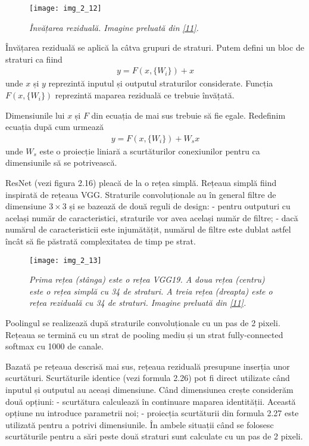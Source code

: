 \begin{figure}[!h]
	\centering
	\texttt{[image: img\_2\_12]}
	\caption[Învățarea reziduală]{\textit{Învățarea reziduală. Imagine preluată din \hyperlink{KaimingHeXiangyuZhangShaoqingRenJianSun}{[11]}.}}
\end{figure}  

Învățarea reziduală se aplică la câtva grupuri de straturi. Putem defini un bloc de straturi ca fiind 
\begin{align}
	y = F(x,\{W_i\}) + x
\end{align}
unde $x$ și $y$ reprezintă inputul și outputul straturilor considerate. Funcția $F(x, \{W_i\})$ reprezintă maparea reziduală ce trebuie învățată.

Dimensiunile lui $x$ și $F$ din ecuația de mai sus trebuie să fie egale. Redefinim ecuația după cum urmează
\begin{align}
	y = F(x,\{W_i\}) + W_sx
\end{align}
unde $W_s$ este o proiecție liniară a scurtăturilor conexiunilor pentru ca dimensiunile să se potrivească.

ResNet (vezi figura 2.16) pleacă de la o rețea simplă. Rețeaua simplă fiind inspirată de rețeaua VGG. Straturile convoluționale au în general filtre de dimensiune $3 \times 3$ și se bazează de două reguli de design: - pentru outputuri cu același număr de caracteristici, straturile vor avea același număr de filtre; - dacă numărul de caracteristicii este injumătățit, numărul de filtre este dublat astfel încât să fie păstrată complexitatea de timp pe strat.

\begin{figure}[!h]
	\centering
	\texttt{[image: img\_2\_13]}
	\caption[Rețeaua ResNet]{\textit{Prima rețea (stânga) este o rețea VGG19. A doua rețea (centru) este o rețea simplă cu 34 de straturi. A treia rețea (dreapta) este o rețea reziduală cu 34 de straturi. Imagine preluată din \hyperlink{KaimingHeXiangyuZhangShaoqingRenJianSun}{[11]}.}}
\end{figure} 

Poolingul se realizează după straturile convoluționale cu un pas de 2 pixeli. Rețeaua se termină cu un strat de pooling mediu și un strat fully-connected softmax cu 1000 de canale.

Bazată pe rețeaua descrisă mai sus, rețeaua reziduală presupune inserția unor scurtături. Scurtăturile identice (vezi formula 2.26) pot fi direct utilizate când inputul și outputul au aceași dimensiune. Când dimensiunea crește considerăm două opțiuni: - scurtătura calculează în continuare maparea identității. Această opțiune nu introduce parametrii noi; - proiecția scurtăturii din formula 2.27 este utilizată pentru a potrivi dimensiunile. În ambele situații când se folosesc scurtăturile pentru a sări peste două straturi sunt calculate cu un pas de 2 pixeli. 

